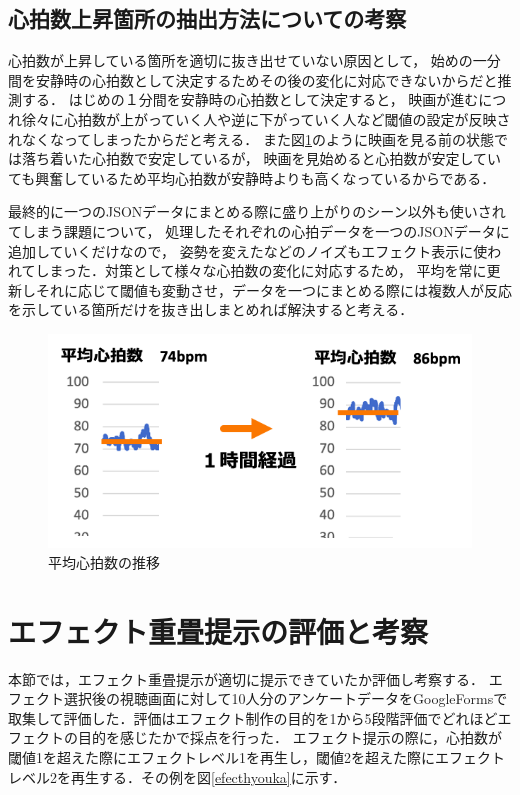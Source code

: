\subsection{心拍数上昇箇所の抽出方法についての考察}
心拍数が上昇している箇所を適切に抜き出せていない原因として，
始めの一分間を安静時の心拍数として決定するためその後の変化に対応できないからだと推測する．
はじめの１分間を安静時の心拍数として決定すると，
映画が進むにつれ徐々に心拍数が上がっていく人や逆に下がっていく人など閾値の設定が反映されなくなってしまったからだと考える．
また図\ref{kekka2}のように映画を見る前の状態では落ち着いた心拍数で安定しているが，
映画を見始めると心拍数が安定していても興奮しているため平均心拍数が安静時よりも高くなっているからである．

最終的に一つのJSONデータにまとめる際に盛り上がりのシーン以外も使いされてしまう課題について，
処理したそれぞれの心拍データを一つのJSONデータに追加していくだけなので，
姿勢を変えたなどのノイズもエフェクト表示に使われてしまった．対策として様々な心拍数の変化に対応するため，
平均を常に更新しそれに応じて閾値も変動させ，データを一つにまとめる際には複数人が反応を示している箇所だけを抜き出しまとめれば解決すると考える． 

\begin{figure}[H]
    \centering
    \includegraphics[width=13cm]{images/chapter4/bpmave.png}
    \caption{平均心拍数の推移}
    \label{kekka2}
\end{figure}

\section{エフェクト重畳提示の評価と考察}
本節では，エフェクト重畳提示が適切に提示できていたか評価し考察する．
エフェクト選択後の視聴画面に対して10人分のアンケートデータをGoogleFormsで取集して評価した．評価はエフェクト制作の目的を1から5段階評価でどれほどエフェクトの目的を感じたかで採点を行った．
エフェクト提示の際に，心拍数が閾値1を超えた際にエフェクトレベル1を再生し，閾値2を超えた際にエフェクトレベル2を再生する．その例を図\ref{efecthyouka}に示す．
 
